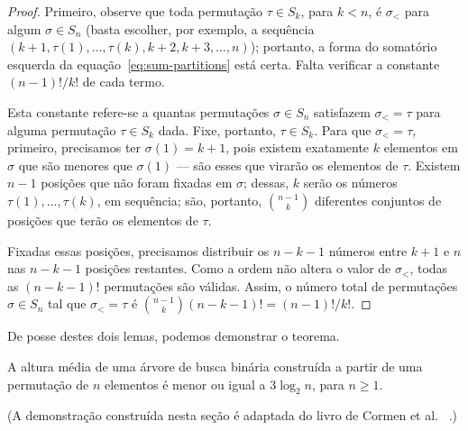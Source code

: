 \begin{proof}
    Primeiro,
    observe que toda permutação $\tau \in S_k$, para $k < n$,
    é $\sigma_<$ para algum $\sigma \in S_n$
    (basta escolher, por exemplo,
    a sequência $(k+1, \tau(1), \dots, \tau(k), k+2, k+3, \dots, n)$);
    portanto,
    a forma do somatório esquerda da equação~\ref{eq:sum-partitions} está certa.
    Falta verificar a constante $(n-1)!/k!$ de cada termo.

    Esta constante refere-se a quantas permutações $\sigma \in S_n$
    satisfazem $\sigma_< = \tau$ para alguma permutação $\tau \in S_k$ dada.
    Fixe, portanto, $\tau \in S_k$.
    Para que $\sigma_< = \tau$,
    primeiro, precisamos ter $\sigma(1) = k+1$,
    pois existem exatamente $k$ elementos em $\sigma$ que são menores que $\sigma(1)$
    --- são esses que virarão os elementos de $\tau$.
    Existem $n-1$ posições que não foram fixadas em $\sigma$;
    dessas, $k$ serão os números $\tau(1), \dots, \tau(k)$,
    em sequência;
    são, portanto, $\binom{n-1}{k}$ diferentes conjuntos de posições
    que terão os elementos de $\tau$.

    Fixadas essas posições,
    precisamos distribuir os $n - k - 1$ números entre $k+1$ e $n$
    nas $n - k - 1$ posições restantes.
    Como a ordem não altera o valor de $\sigma_<$,
    todas as $(n - k - 1)!$ permutações são válidas.
    Assim, o número total de permutações $\sigma \in S_n$
    tal que $\sigma_< = \tau$ é $\binom{n-1}{k} (n-k-1)! = (n-1)!/k!$.
\end{proof}

De posse destes dois lemas,
podemos demonstrar o teorema.

\begin{theorem}
    A altura média de uma árvore de busca binária
    construída a partir de uma permutação de $n$ elementos
    é menor ou igual a $3 \log_2 n$, para $n \geq 1$.
    \label{thm:average-tree-depth}
\end{theorem}

(A demonstração construída nesta seção é adaptada do livro de Cormen et al.%
~\cite[p.~300]{CormenLeisersonRivestStein2009}.)

